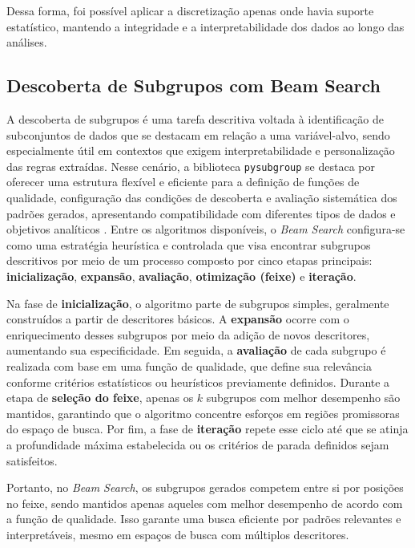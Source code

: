 \documentclass[12pt]{article}
\begin{document}
Dessa forma, foi possível aplicar a discretização apenas onde havia suporte estatístico, mantendo a integridade e a interpretabilidade dos dados ao longo das análises.

\subsection{Descoberta de Subgrupos com Beam Search}

A descoberta de subgrupos é uma tarefa descritiva voltada à identificação de subconjuntos de dados que se destacam em relação a uma variável-alvo, sendo especialmente útil em contextos que exigem interpretabilidade e personalização das regras extraídas. Nesse cenário, a biblioteca \texttt{pysubgroup} se destaca por oferecer uma estrutura flexível e eficiente para a definição de funções de qualidade, configuração das condições de descoberta e avaliação sistemática dos padrões gerados, apresentando compatibilidade com diferentes tipos de dados e objetivos analíticos \cite{lemmerich:18}. Entre os algoritmos disponíveis, o \textit{Beam Search} configura-se como uma estratégia heurística e controlada que visa encontrar subgrupos descritivos por meio de um processo composto por cinco etapas principais: \textbf{inicialização}, \textbf{expansão}, \textbf{avaliação}, \textbf{otimização (feixe)} e \textbf{iteração}.

Na fase de \textbf{inicialização}, o algoritmo parte de subgrupos simples, geralmente construídos a partir de descritores básicos. A \textbf{expansão} ocorre com o enriquecimento desses subgrupos por meio da adição de novos descritores, aumentando sua especificidade. Em seguida, a \textbf{avaliação} de cada subgrupo é realizada com base em uma função de qualidade, que define sua relevância conforme critérios estatísticos ou heurísticos previamente definidos. Durante a etapa de \textbf{seleção do feixe}, apenas os $k$ subgrupos com melhor desempenho são mantidos, garantindo que o algoritmo concentre esforços em regiões promissoras do espaço de busca. Por fim, a fase de \textbf{iteração} repete esse ciclo até que se atinja a profundidade máxima estabelecida ou os critérios de parada definidos sejam satisfeitos.

Portanto, no \textit{Beam Search}, os subgrupos gerados competem entre si por posições no feixe, sendo mantidos apenas aqueles com melhor desempenho de acordo com a função de qualidade. Isso garante uma busca eficiente por padrões relevantes e interpretáveis, mesmo em espaços de busca com múltiplos descritores.
\end{document}
